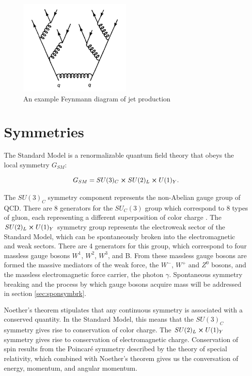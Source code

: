 \begin{figure}
	\centering
	\includegraphics[width=0.5\textwidth]{figures/ch1/jet_feynmann.png}
	\caption{An example Feynmann diagram of jet production}
	\label{fig:jet_feynmann}
\end{figure}

\section{Symmetries}

The Standard Model is a renormalizable quantum field theory that obeys the local symmetry $G_{SM}$:

\begin{equation}
	G_{SM} = SU(3)_C \cross SU(2)_L \cross U(1)_Y .
\end{equation}

The $SU(3)_C$ symmetry component represents the non-Abelian gauge group of QCD. There are 8 generators for the $SU_C (3)$ group which correspond to 8 types of gluon, each representing a different superposition of color charge \cite{pdg}. The $SU(2)_L \cross U(1)_Y$ symmetry group represents the electroweak sector of the Standard Model, which can be spontaneously broken into the electromagnetic and weak sectors. There are 4 generators for this group, which correspond to four massless gauge bosons $W^1$, $W^2$, $W^3$, and B. From these massless gauge bosons are formed the massive mediators of the weak force, the $W^-$, $W^+$ and $Z^0$ bosons, and the massless electromagnetic force carrier, the photon $\gamma$. Spontaneous symmetry breaking and the process by which gauge bosons acquire mass will be addressed in section \ref{sec:sponsymbrk}. \par

Noether's theorem \cite{Noether} stipulates that any continuous symmetry is associated with a conserved quantity. In the Standard Model, this means that the $SU(3)_C$ symmetry gives rise to conservation of color charge. The $SU(2)_L \cross U(1)_Y$ symmetry gives rise to conservation of electromagnetic charge. Conservation of spin results from the Poincar\'e symmetry described by the theory of special relativity, which combined with Noether's theorem gives us the conversation of energy, momentum, and angular momentum.\par

